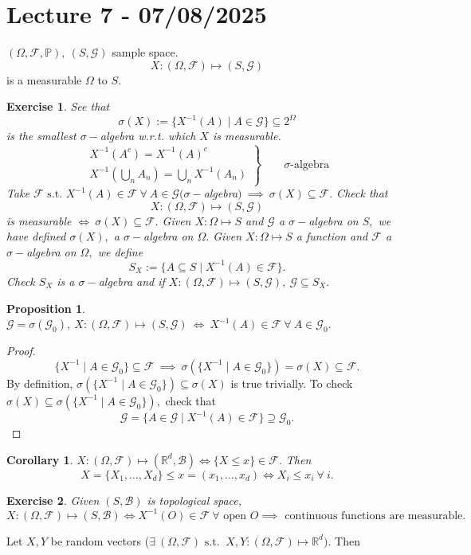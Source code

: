\documentclass{article}
\newcommand{\1}{\mathds{1}}
\newcommand{\R}{\mathbb{R}}
\newcommand{\F}{\mathcal{F}}
\newcommand{\B}{\mathcal{B}}
\newcommand{\G}{\mathcal{G}}
\newcommand{\PB}{\mathbb{P}}
\newcommand{\st}{\text{ s.t. }}
\newtheorem{corollary}[theorem]{Corollary}
\newtheorem{proposition}[theorem]{Proposition}
\newtheorem{exercise}{Exercise}
\begin{document}
\section{Lecture 7 - 07/08/2025}
$(\Omega,\F,\PB),\ (S,\G)$ sample space. $$X:(\Omega,\F)\mapsto (S,\G)$$ is a measurable $\Omega$ to $S.$ 
\begin{exercise} See that 
    $$\sigma(X):=\{X^{-1}(A)\mid A\in\G\}\subseteq 2^\Omega$$ is the smallest $\sigma-$algebra w.r.t. which $X$ is measurable.
    \[
    \left.
\begin{array}{l}
    X^{-1}(A^c) = X^{-1}(A)^c \\
    X^{-1}\left( \bigcup_n A_n \right) = \bigcup_n X^{-1}(A_n)
\end{array}
\right\}
\qquad \text{$\sigma$-algebra}
\]
Take $\F\st X^{-1}(A)\in\F\ \forall\ A\in\G(\sigma-$algebra$)\ \implies\ \sigma(X)\subseteq\F.$ Check that $$X:(\Omega,\F)\mapsto (S,\G)$$ is measurable $\iff\ \sigma(X)\subseteq\F.$ Given $X:\Omega\mapsto S$ and $\G$ a $\sigma-$algebra on $S,$ we have defined $\sigma(X),$ a $\sigma-$algebra on $\Omega.$ Given $X:\Omega\mapsto S$ a function and $\F$ a $\sigma-$algebra on $\Omega,$ we define $$S_X:=\{A\subseteq S\mid X^{-1}(A)\in\F\}.$$ Check $S_X$ is a $\sigma-$algebra and if $X:(\Omega,\F)\mapsto (S,\G),\ \G\subseteq S_X.$
\end{exercise}
\begin{proposition}
    $\G=\sigma(\G_0),\ X:(\Omega,\F)\mapsto (S,\G)\ \iff\ X^{-1}(A)\in \F\ \forall\ A\in\G_0.$
\end{proposition}
\begin{proof}
    $$\{X^{-1}\mid A\in\G_0\}\subseteq\F\ \implies\ \sigma(\{X^{-1}\mid A\in\G_0\})=\sigma(X)\subseteq\F.$$ By definition, $\sigma(\{X^{-1}\mid A\in\G_0\})\subseteq\sigma(X)$ is true trivially. To check $\sigma(X)\subseteq \sigma(\{X^{-1}\mid A\in\G_0\}),$ check that $$\G=\{A\in\G\mid X^{-1}(A)\in\F\}\supseteq\G_0.$$
\end{proof}
\begin{corollary}
    $X:(\Omega,\F)\mapsto (\R^d,\B)\iff \{X\leq x\}\in\F.$  Then $$X=\{X_1,\ldots,X_d\}\leq x=(x_1,\ldots,x_d)\iff X_i\leq x_i\ \forall\ i.$$
\end{corollary}
\begin{exercise}
    Given $(S,\B)$ is topological space, $$X:(\Omega,\F)\mapsto (S,\B)\iff X^{-1}(O)\in\F\ \forall\text{ open }O\implies\text{ continuous functions are measurable}.$$ 
\end{exercise}
Let $X,Y$ be random vectors ($\exists\ (\Omega,\F)\st\ X,Y:(\Omega,\F)\mapsto \R^d).$ Then
\end{document}
